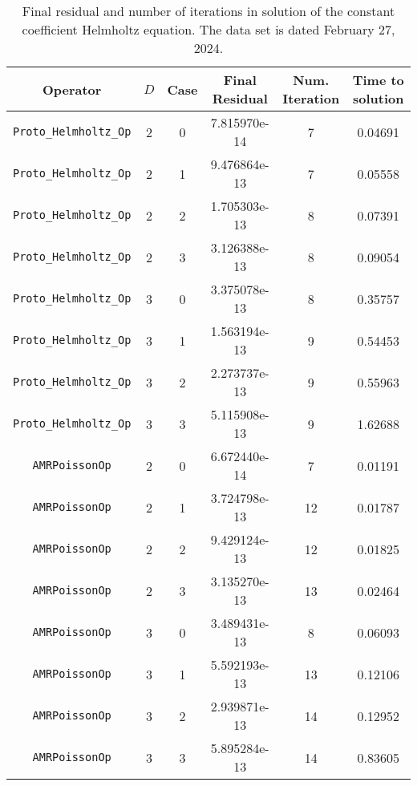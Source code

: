 \documentclass{article}
\begin{document}
\begin{itemize}
\begin{small}
\begin{table}
\begin{center}
\begin{tabular}{|c|c|c|c|c||c|} \hline
 Operator                   & $D$ & Case & Final Residual &
 Num. Iteration & Time to solution\\
\hline
 {\tt Proto\_Helmholtz\_Op}       & 2   & 0    & 7.815970e-14   & 7    & 0.04691   \\
 {\tt Proto\_Helmholtz\_Op}       & 2   & 1    & 9.476864e-13   & 7    & 0.05558   \\
 {\tt Proto\_Helmholtz\_Op}       & 2   & 2    & 1.705303e-13   & 8    & 0.07391   \\
 {\tt Proto\_Helmholtz\_Op}       & 2   & 3    & 3.126388e-13   & 8    & 0.09054   \\
 {\tt Proto\_Helmholtz\_Op}       & 3   & 0    & 3.375078e-13   & 8    & 0.35757   \\
 {\tt Proto\_Helmholtz\_Op}       & 3   & 1    & 1.563194e-13   & 9    & 0.54453   \\
 {\tt Proto\_Helmholtz\_Op}       & 3   & 2    & 2.273737e-13   & 9    & 0.55963   \\
 {\tt Proto\_Helmholtz\_Op}       & 3   & 3    & 5.115908e-13   & 9    & 1.62688   \\
 \hline                                                        
 {\tt AMRPoissonOp}               & 2   & 0    & 6.672440e-14   &  7    &  0.01191  \\
 {\tt AMRPoissonOp}               & 2   & 1    & 3.724798e-13   &  12   &  0.01787  \\
 {\tt AMRPoissonOp}               & 2   & 2    & 9.429124e-13   &  12   &  0.01825  \\
 {\tt AMRPoissonOp}               & 2   & 3    & 3.135270e-13   &  13   &  0.02464  \\
 {\tt AMRPoissonOp}               & 3   & 0    & 3.489431e-13   &  8    &  0.06093  \\
 {\tt AMRPoissonOp}               & 3   & 1    & 5.592193e-13   &  13   &  0.12106  \\
 {\tt AMRPoissonOp}               & 3   & 2    & 2.939871e-13   &  14   &  0.12952  \\
 {\tt AMRPoissonOp}               & 3   & 3    & 5.895284e-13   &  14   &  0.83605  \\
\hline
\end{tabular}
\end{center}
\label{tab::helmholtz3}
\caption
    {
      Final residual and number of iterations in solution of the  constant
      coefficient Helmholtz equation.
      The data set is dated February 27, 2024.
    }
\end{table}
\end{small}


\end{itemize}
\end{document}
